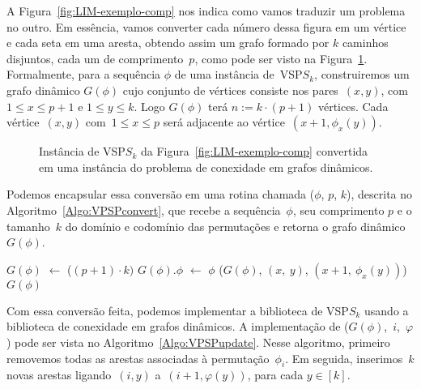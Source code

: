 A Figura~\ref{fig:LIM-exemplo-comp} nos indica como vamos traduzir um problema no outro. Em essência, vamos converter cada número dessa figura em um vértice e cada seta em uma aresta, obtendo assim um grafo formado por $k$ caminhos disjuntos, cada um de comprimento~$p$, como pode ser visto na Figura~\ref{fig:LIM-convertido}. Formalmente, para a sequência $\phi$ de uma instância de~VSP$S_k$, construiremos um grafo dinâmico $G(\phi)$ cujo conjunto de vértices consiste nos pares~$(x,y)$, com $1\leqslant x \leqslant p+1$ e $1\leqslant y \leqslant k$. Logo $G(\phi)$ terá $n:=k\cdot (p+1)$ vértices. Cada vértice~$(x,y)$ com~$1\leqslant x \leqslant p$ será adjacente ao vértice~$(x+1,\phi_x(y))$. 



\begin{figure}[htb]
\centering

\caption{Instância de VSP$S_k$ da Figura~\ref{fig:LIM-exemplo-comp} convertida em uma instância do problema de conexidade em grafos dinâmicos.}
\label{fig:LIM-convertido}
\end{figure}

Podemos encapsular essa conversão em uma rotina chamada \VPSPconvert($\phi$, $p$, $k$), descrita no Algoritmo~\ref{Algo:VPSPconvert}, que recebe a sequência~$\phi$, seu comprimento $p$ e o tamanho~$k$ do domínio e codomínio das permutações e retorna o grafo dinâmico~$G(\phi)$.

\begin{algorithm}[htb]
\caption{\VPSPconvert($\phi$, $p$, $k$)}
\label{Algo:VPSPconvert}
\begin{algorithmic}[1]
\State $G(\phi)$ $\gets$ \dymGraphCreate($(p+1)\cdot k)$
\State $G(\phi).\phi$ $\gets$ $\phi$
    \State \dymGraphAddEdge($G(\phi)$, $(x,~y)$, $(x+1, ~\phi_x(y))$)
  \EndFor
\EndFor
\State \Return $G(\phi)$
\end{algorithmic}
\end{algorithm}


Com essa conversão feita, podemos implementar a biblioteca de VSP$S_k$ usando a biblioteca de conexidade em grafos dinâmicos. A implementação de \mbox{\VPSPupdate($G(\phi)$, $i$,~$\varphi$)} pode ser vista no Algoritmo~\ref{Algo:VPSPupdate}. Nesse algoritmo, primeiro removemos todas as arestas associadas à permutação~$\phi_i$. Em seguida, inserimos~$k$ novas arestas ligando~$(i,y)$ a~$(i+1,\varphi(y))$, para cada $y\in[k]$.


